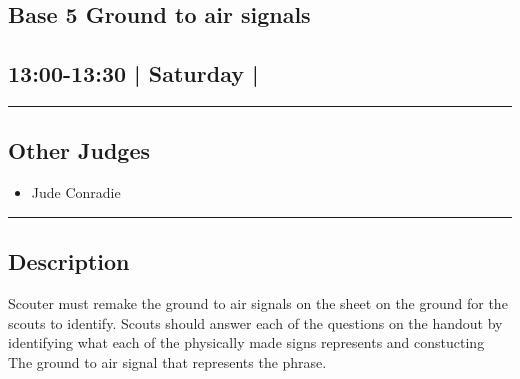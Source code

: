 \documentclass[10pt, A5]{article}
\begin{document}
		\begin{framed}
			\begin{minipage}{\textwidth}

			\setcounter{section}{32}
							\section{\faStar \: Base 5 \faStar \: Ground to air signals}
						
			\subsection*{13:00-13:30 | Saturday | }

			\vspace{0.25cm}
			\hrule
			\vspace{0.25cm}


			\subsection*{Other Judges}
							

				\begin{multicols}{2}

			\begin{itemize}
											\item Jude Conradie
								\end{itemize}

			\vfill\null
			\columnbreak

			\begin{itemize}
								\end{itemize}

			\vfill\null

			\end{multicols}

			\vspace{0.25cm}
			\hrule
			\vspace{0.25cm}

			\begin{minipage}{\textwidth}
			\subsection*{\faListAlt \: Description}
			Scouter must remake the ground to air signals on the sheet on the ground for the scouts to identify. Scouts should answer each of the questions on the handout by identifying what each of the physically made signs represents and constucting The ground to air signal that represents the phrase.
			\end{minipage}


	\end{minipage}
	\end{framed}
\end{document}
